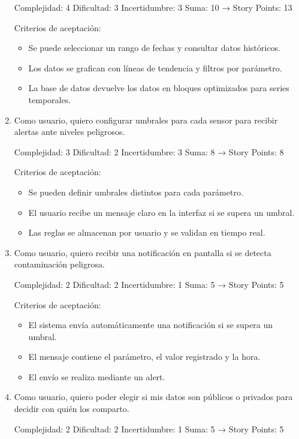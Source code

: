 \documentclass[
11pt, %
]{charter}
\begin{document}
\begin{enumerate}
Complejidad: 4
Dificultad: 3
Incertidumbre: 3
Suma: 10 → Story Points: 13

Criterios de aceptación:
\begin{itemize}
	\item Se puede seleccionar un rango de fechas y consultar datos históricos.
	\item Los datos se grafican con líneas de tendencia y filtros por parámetro.
	\item La base de datos devuelve los datos en bloques optimizados para series temporales.
\end{itemize}

\item Como usuario, quiero configurar umbrales para cada sensor para recibir alertas ante niveles peligrosos.

Complejidad: 3
Dificultad: 2
Incertidumbre: 3
Suma: 8 → Story Points: 8

Criterios de aceptación:

\begin{itemize}
	\item Se pueden definir umbrales distintos para cada parámetro.
	\item El usuario recibe un mensaje claro en la interfaz si se supera un umbral.
	\item Las reglas se almacenan por usuario y se validan en tiempo real.
\end{itemize}

\item Como usuario, quiero recibir una notificación en pantalla si se detecta contaminación peligrosa.

Complejidad: 2
Dificultad: 2
Incertidumbre: 1
Suma: 5 → Story Points: 5

Criterios de aceptación:

\begin{itemize}
	\item El sistema envía automáticamente una notificación si se supera un umbral.
	\item El mensaje contiene el parámetro, el valor registrado y la hora.
	\item El envío se realiza mediante un alert.

\end{itemize}

\item Como usuario, quiero poder elegir si mis datos son públicos o privados para decidir con quién los comparto.

Complejidad: 2
Dificultad: 2
Incertidumbre: 1
Suma: 5 → Story Points: 5


\end{enumerate}
\end{document}
